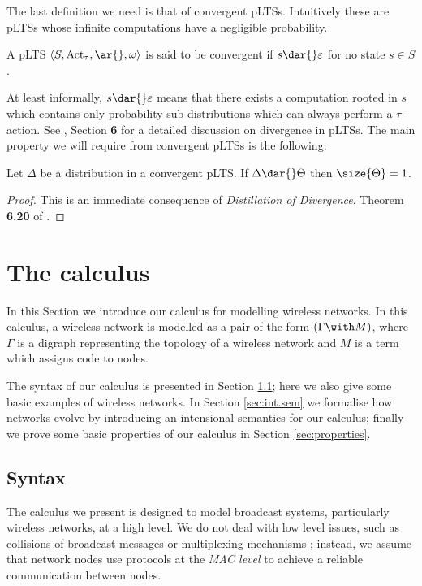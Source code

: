 \documentclass{LMCS}
\begin{document}
The last definition we need is that of convergent pLTSs. 
Intuitively these are pLTSs whose infinite computations 
have a negligible probability.
\begin{defi}[Convergence]
A pLTS $\langle S, \mbox{Act}_{\tau}, \ar{}, \omega \rangle$ 
is said to be convergent if $s \dar{} \varepsilon$ 
for no state $s \in S$. 
\end{defi}
\noindent
At least informally, $s \dar{} \varepsilon$ means that 
there exists a computation rooted in $s$ which contains 
only probability sub-distributions which 
can always perform a $\tau$-action. 
See \cite{DGHM09full}, Section \textbf{6} 
for a detailed discussion on divergence in pLTSs.
The main property we will require from convergent pLTSs 
	is the following:

\begin{prop}
\label{prop:convergent.moves}
Let $\Delta$ be a distribution in a convergent pLTS. 
If $\Delta \dar{} \Theta$ then $\size{\Theta} = 1$. 
\end{prop}
\begin{proof}
This is an immediate consequence of \emph{Distillation of 
Divergence}, Theorem \textbf{6.20} of \cite{DGHM09full}.
\end{proof}

\section{The calculus}
\label{sec:lang}
In this Section we introduce our calculus for modelling wireless networks. 
In this calculus, a wireless network is modelled as a pair of the form 
$(\Gamma \with M)$, where $\Gamma$ is a digraph representing the 
topology of a wireless network and $M$ is a term which assigns code to 
nodes. 

The syntax of our calculus is presented in Section \ref{sec:syntax}; 
here we also give some basic examples of wireless networks. 
In Section \ref{sec:int.sem} we formalise how networks evolve by 
introducing an intensional semantics for our calculus; 
finally we prove some basic properties of our calculus in 
Section \ref{sec:properties}.

\subsection{Syntax}
\label{sec:syntax}
The calculus we present is designed to model broadcast systems, particularly wireless 
networks, at a high level. We do not deal with low level issues, such as collisions of 
broadcast messages or multiplexing mechanisms \cite{tanenbaum}; instead, 
we assume that network nodes use protocols  at the \emph{MAC level} \cite{macsurvey} 
to achieve a reliable communication 
between nodes.
\end{document}
